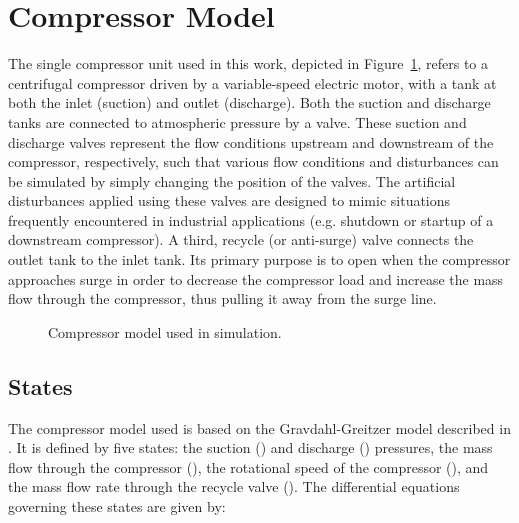 \section{Compressor Model}
\label{sec:mod:comp}

The single compressor unit used in this work, depicted in Figure~\ref{fig:mod:single-comp}, refers to a centrifugal compressor driven by a variable-speed electric motor, with a tank at both the inlet (suction) and outlet (discharge).
Both the suction and discharge tanks are connected to atmospheric pressure by a valve.
These suction and discharge valves represent the flow conditions upstream and downstream of the compressor, respectively, such that various flow conditions and disturbances can be simulated by simply changing the position of the valves.
The artificial disturbances applied using these valves are designed to mimic situations frequently encountered in industrial applications (e.g. shutdown or startup of a downstream compressor).
A third, recycle (or anti-surge) valve connects the outlet tank to the inlet tank. Its primary purpose is to open when the compressor approaches surge in order to decrease the compressor load and increase the mass flow through the compressor, thus pulling it away from the surge line.

\begin{figure}
  \centering
  \resizebox{0.8\linewidth}{!}{%
    \begin{tikzpicture}
      \drawcomp
    \end{tikzpicture}
  }
  \caption{Compressor model used in simulation.}
  \label{fig:mod:single-comp}
\end{figure}



\subsection{States}
The compressor model used is based on the Gravdahl-Greitzer model described in \cite{Gravdahl1999}. It is defined by five states: the suction () and discharge () pressures, the mass flow through the compressor (), the rotational speed of the compressor (), and the mass flow rate through the recycle valve ().
The differential equations governing these states are given by:

